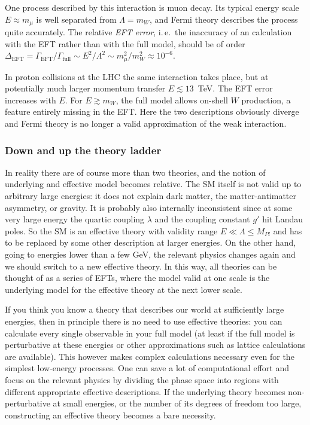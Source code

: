 One process described by this interaction is muon decay. Its typical
energy scale $E \approx m_\mu$ is well separated from $\Lambda = m_W$,
and Fermi theory describes the process quite accurately. The relative
\emph{EFT error}, i.\,e.\ the inaccuracy of an calculation with the
EFT rather than with the full model, should be of order
$\Delta_\text{EFT} = \Gamma_\text{EFT} / \Gamma_\text{full} \sim E^2 /
\Lambda^2 \sim m_\mu^2 / m_W^2 \approx 10^{-6}$.

In proton collisions at the LHC the same interaction takes place, but
at potentially much larger momentum transfer $E \lesssim 13$~TeV. The
EFT error increases with $E$. For $E \gtrsim m_W$, the full model
allows on-shell $W$ production, a feature entirely missing in the
EFT. Here the two descriptions obviously diverge and Fermi theory is
no longer a valid approximation of the weak interaction.



\subsubsection{Down and up the theory ladder}

In reality there are of course more than two theories, and the notion
of underlying and effective model becomes relative. The SM itself is
not valid up to arbitrary large energies: it does not explain dark
matter, the matter-antimatter asymmetry, or gravity. It is probably
also internally inconsistent since at some very large energy the
quartic coupling $\lambda$ and the coupling constant $g'$ hit Landau
poles. So the SM is an effective theory with validity range
$E \ll \Lambda \le M_{Pl}$ and has to be replaced by some other
description at larger energies. On the other hand, going to energies
lower than a few GeV, the relevant physics changes again and we should
switch to a new effective theory. In this way, all theories can be
thought of as a series of EFTs, where the model valid at one scale is
the underlying model for the effective theory at the next lower scale.

If you think you know a theory that describes our world at
sufficiently large energies, then in principle there is no need to use
effective theories: you can calculate every single observable in your
full model (at least if the full model is perturbative at these
energies or other approximations such as lattice calculations are
available). This however makes complex calculations necessary even for
the simplest low-energy processes. One can save a lot of computational
effort and focus on the relevant physics by dividing the phase space
into regions with different appropriate effective descriptions. If the
underlying theory becomes non-perturbative at small energies, or the
number of its degrees of freedom too large, constructing an effective
theory becomes a bare necessity.

